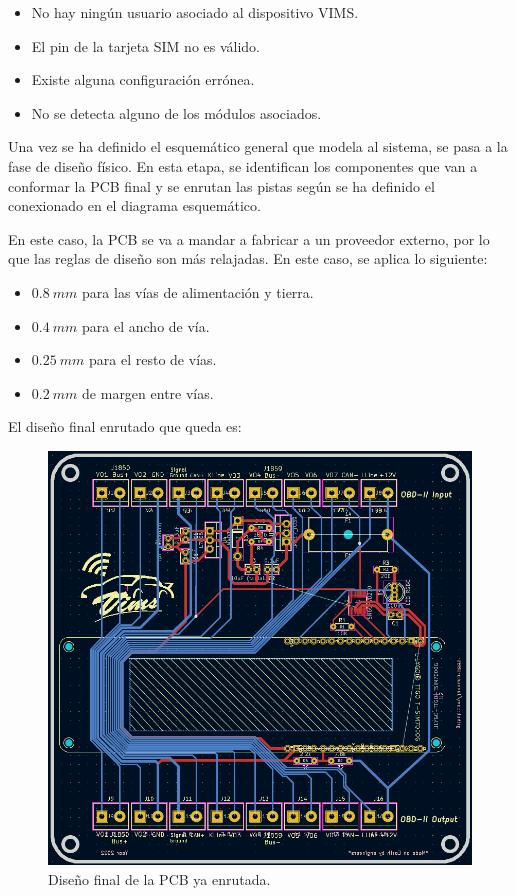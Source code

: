 \begin{itemize}
  \item No hay ningún usuario asociado al dispositivo \ac{VIMS}.
  \item El pin de la tarjeta SIM no es válido.
  \item Existe alguna configuración errónea.
  \item No se detecta alguno de los módulos asociados.
\end{itemize}

Una vez se ha definido el esquemático general que modela al sistema, se pasa a la
fase de diseño físico. En esta etapa, se identifican los componentes que van a
conformar la PCB final y se enrutan las pistas según se ha definido el conexionado
en el diagrama esquemático.

En este caso, la PCB se va a mandar a fabricar a un proveedor externo, por lo que
las reglas de diseño son más relajadas. En este caso, se aplica lo siguiente:

\begin{itemize}
  \item $0.8~mm$ para las vías de alimentación y tierra.
  \item $0.4~mm$ para el ancho de vía.
  \item $0.25~mm$ para el resto de vías.
  \item $0.2~mm$ de margen entre vías.
\end{itemize}

El diseño final enrutado que queda es:

\begin{figure}[H]
  \centering
  \includegraphics[width=\linewidth]{images/pcb-design.png}
  \caption{Diseño final de la PCB ya enrutada.}
  \label{fig:pcb-design}
\end{figure}

